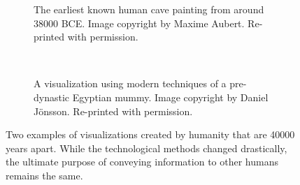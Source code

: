 \begin{figure}
  \centering
  \begin{subfigure}{\abtwoimagewidth}
    \caption{The earliest known human cave painting from around 38000 BCE. Image copyright by Maxime Aubert. Re-printed with permission.}
    \label{fig:motivation:vis:cave}
  \end{subfigure}
  ~
  \begin{subfigure}{\abtwoimagewidth}
    \caption{A visualization using modern techniques of a pre-dynastic Egyptian mummy. Image copyright by Daniel J\"onsson. Re-printed with permission.}
    \label{fig:motivation:vis:modern}
  \end{subfigure}
  \caption{Two examples of visualizations created by humanity that are 40000 years apart.  While the technological methods changed drastically, the ultimate purpose of conveying information to other humans remains the same.}
  \label{fig:motivation:vis}
\end{figure}

